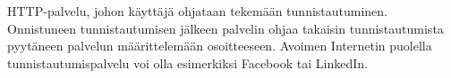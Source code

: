 HTTP-palvelu, johon käyttäjä ohjataan tekemään tunnistautuminen. Onnistuneen tunnistautumisen jälkeen palvelin ohjaa takaisin tunnistautumista pyytäneen palvelun määrittelemään osoitteeseen. Avoimen Internetin puolella tunnistautumispalvelu voi olla esimerkiksi Facebook tai LinkedIn.